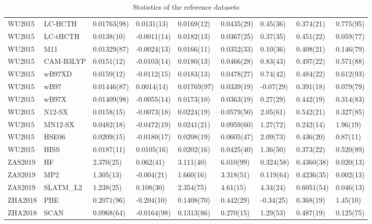 \begin{table}[ht]
\begin{tabular}{lllllllll}
  WU2015 & LC-HCTH & 0.01763(98) & 0.0131(13) & 0.0169(12) & 0.0435(29) & 0.45(36) & 0.374(21) & 0.775(95) \\ 
  WU2015 & LC-tHCTH & 0.0138(10) & -0.0011(14) & 0.0182(13) & 0.0367(25) & 0.37(35) & 0.451(22) & 0.059(77) \\ 
  WU2015 & M11 & 0.01329(87) & -0.0024(13) & 0.0166(11) & 0.0352(33) & 0.10(36) & 0.408(21) & 0.146(79) \\ 
  WU2015 & CAM-B3LYP & 0.0151(12) & -0.0103(14) & 0.0180(13) & 0.0466(28) & 0.83(43) & 0.497(22) & 0.571(88) \\ 
  WU2015 & wB97XD & 0.0159(12) & -0.0112(15) & 0.0183(13) & 0.0478(27) & 0.74(42) & 0.484(22) & 0.612(93) \\ 
  WU2015 & wB97 & 0.01446(87) & 0.0014(14) & 0.01769(97) & 0.0339(19) & -0.07(29) & 0.391(18) & 0.079(79) \\ 
  WU2015 & wB97X & 0.01409(98) & -0.0055(14) & 0.0173(10) & 0.0363(19) & 0.27(29) & 0.442(19) & 0.314(83) \\ 
  WU2015 & N12-SX & 0.0158(15) & -0.0073(18) & 0.0224(19) & 0.0579(50) & 2.05(61) & 0.542(21) & 0.327(85) \\ 
  WU2015 & MN12-SX & 0.0482(18) & -0.0472(19) & 0.0241(21) & 0.0959(60) & 1.27(72) & 0.242(14) & 1.96(19) \\ 
  WU2015 & HSE06 & 0.0209(15) & -0.0180(17) & 0.0208(19) & 0.0605(47) & 2.09(73) & 0.436(20) & 0.87(11) \\ 
  WU2015 & HISS & 0.0187(11) & 0.0105(16) & 0.0202(16) & 0.0425(40) & 1.36(50) & 0.373(22) & 0.520(89) \\ 
  ZAS2019 & HF & 2.370(25) & 0.062(41) & 3.111(40) & 6.010(99) & 0.324(58) & 0.4360(38) & 0.020(13) \\ 
  ZAS2019 & MP2 & 1.305(13) & -0.004(21) & 1.660(16) & 3.318(51) & 0.119(64) & 0.4236(35) & 0.002(13) \\ 
  ZAS2019 & SLATM\_L2 & 1.238(25) & 0.108(30) & 2.354(75) & 4.61(15) & 4.34(24) & 0.6051(54) & 0.046(13) \\ 
  ZHA2018 & PBE & 0.2071(96) & -0.204(10) & 0.1408(70) & 0.442(29) & -0.34(25) & 0.368(19) & 1.45(10) \\ 
  ZHA2018 & SCAN & 0.0968(64) & -0.0164(98) & 0.1313(86) & 0.270(15) & 1.29(53) & 0.487(19) & 0.125(75) \\ 
   \hline
\end{tabular}
\caption{Statistics of the reference datasets} 
\label{tab:statsRef}
\end{table}
